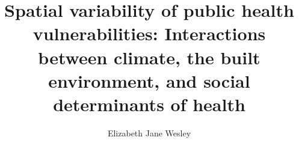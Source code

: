 \documentclass{article}
\begin{document}
\title{Spatial variability of public health vulnerabilities: Interactions between climate, the built environment, and social determinants of health}
\author{Elizabeth Jane Wesley}

\maketitle











\end{document}
